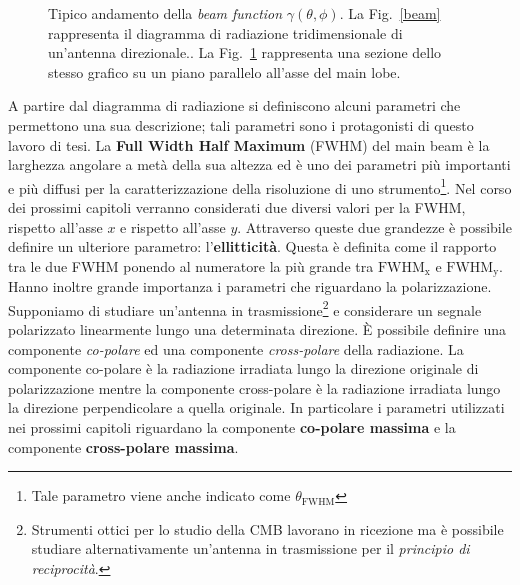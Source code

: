 \documentclass[12pt,a4paper,final]{book}
\begin{document}
\begin{figure}[!ht]
\begin{subfigure}{0.45\textwidth}
		\caption{}
		\label{beam_cut}
	\end{subfigure}
\caption{Tipico andamento della \textit{beam function} $\gamma(\theta,\phi)$. La Fig.~\ref{beam} rappresenta il diagramma di radiazione tridimensionale di un'antenna direzionale.\cite{cmb}. La Fig.~\ref{beam_cut} rappresenta una sezione dello stesso grafico su un piano parallelo all'asse del main lobe.\cite{planck}}
\label{diag_rad}
\end{figure}
A partire dal diagramma di radiazione si definiscono alcuni parametri che permettono una sua descrizione; tali parametri sono i protagonisti di questo lavoro di tesi.
La \textbf{Full Width Half Maximum} (FWHM) del main beam è la larghezza angolare a metà della sua altezza ed è uno dei parametri più importanti e più diffusi per la caratterizzazione della risoluzione di uno strumento\footnote{Tale parametro viene anche indicato come $\theta_\text{FWHM}$}. Nel corso dei prossimi capitoli verranno considerati due diversi valori per la FWHM, rispetto all'asse $x$ e rispetto all'asse $y$. Attraverso queste due grandezze è possibile definire un ulteriore parametro: l'\textbf{ellitticità}. Questa è definita come il rapporto tra le due FWHM ponendo al numeratore la più grande tra $\text{FWHM}_\text{x}$ e $\text{FWHM}_\text{y}$.
Hanno inoltre grande importanza i parametri che riguardano la polarizzazione. Supponiamo di studiare un'antenna in trasmissione\footnote{Strumenti ottici per lo studio della CMB lavorano in ricezione ma è possibile studiare alternativamente un'antenna in trasmissione per il \textit{principio di reciprocità}.} e considerare un segnale polarizzato linearmente lungo una determinata direzione.
\`E possibile definire una componente \textit{co-polare} ed una componente \textit{cross-polare} della radiazione. La componente co-polare è la radiazione irradiata lungo la direzione originale di polarizzazione mentre la componente cross-polare è la radiazione irradiata lungo la direzione perpendicolare a quella originale.
In particolare i parametri utilizzati nei prossimi capitoli riguardano la componente \textbf{co-polare massima} e la componente \textbf{cross-polare massima}.
\end{document}
